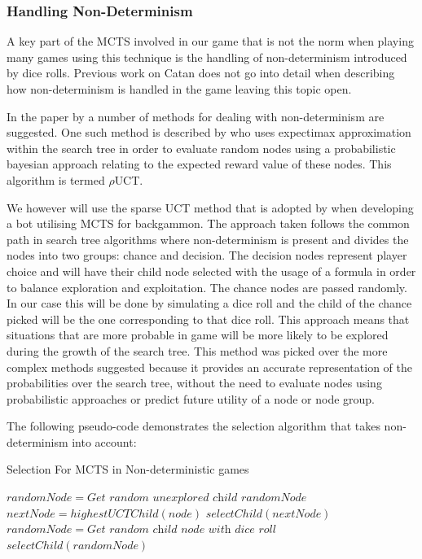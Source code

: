 \documentclass[]{article}
\begin{document}
\subsubsection{Handling Non-Determinism}
A key part of the MCTS involved in our game that is not the norm when playing many games using this technique is the handling of non-determinism introduced by dice rolls. Previous work on Catan does not go into detail when describing how non-determinism is handled in the game leaving this topic open. 

\par In the paper by \textcite{browne2012survey} a number of methods for dealing with non-determinism are suggested. One such method is described by \textcite{veness2011monte} who uses expectimax approximation within the search tree in order to evaluate random nodes using a probabilistic bayesian approach relating to the expected reward value of these nodes. This algorithm is termed $\rho$UCT.

\par We however will use the sparse UCT method \textcite{bjarnason2009lower} that is adopted by \textcite{van2007monte} when developing a bot utilising MCTS for backgammon. The approach taken follows the common path in search tree algorithms where non-determinism is present and divides the nodes into two groups: chance and decision. The decision nodes represent player choice and will have their child node selected with the usage of a formula in order to balance exploration and exploitation. The chance nodes are passed randomly. In our case this will be done by simulating a dice roll and the child of the chance picked will be the one corresponding to that dice roll. This approach means that situations that are more probable in game will be more likely to be explored during the growth of the search tree. This method was picked over the more complex methods suggested because it provides an accurate representation of the probabilities over the search tree, without the need to evaluate nodes using probabilistic approaches or predict future utility of a node or node group.

\par The following pseudo-code demonstrates the selection algorithm that takes non-determinism into account:

\begin{algorithm}
\caption{Selection For MCTS in Non-deterministic games}\label{select}
\begin{algorithmic}[1]
		\State $randomNode = \textit{Get random unexplored child} $
		\State \Return $randomNode$
	\Else
		\State $nextNode = highestUCTChild(node)$ 
		\State $selectChild(nextNode)$
	\EndIf
\Else
	\State $ randomNode = \textit{Get random child node with dice roll}$
	\State $ selectChild(randomNode) $
\EndIf
\EndProcedure

\end{algorithmic}
\end{algorithm}
\end{document}
